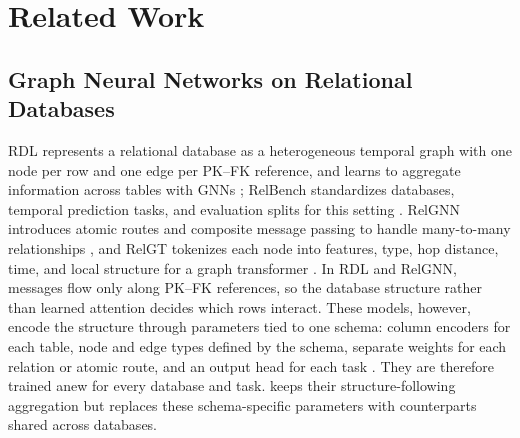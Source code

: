 \section{Related Work}
\label{sec:related}

\subsection{Graph Neural Networks on Relational Databases}
RDL represents a relational database as a heterogeneous temporal graph with
one node per row and one edge per PK--FK reference, and learns to aggregate
information across tables with GNNs \citep{fey2024rdl}; RelBench
standardizes databases, temporal prediction tasks, and evaluation splits for
this setting \citep{robinson2024relbench}. RelGNN introduces atomic routes
and composite message passing to handle many-to-many relationships
\citep{chen2025relgnn}, and RelGT tokenizes each node into features, type,
hop distance, time, and local structure for a graph transformer
\citep{dwivedi2026relgt}. In RDL and RelGNN, messages flow only along PK--FK
references, so the database structure rather than learned attention decides
which rows interact. These models, however, encode the structure through
parameters tied to one schema: column encoders for each table, node and edge
types defined by the schema, separate weights for each relation or atomic
route, and an output head for each task
\citep{fey2024rdl,robinson2024relbench,chen2025relgnn}. They are therefore
trained anew for every database and task. \model{} keeps their
structure-following aggregation but replaces these schema-specific parameters
with counterparts shared across databases.


